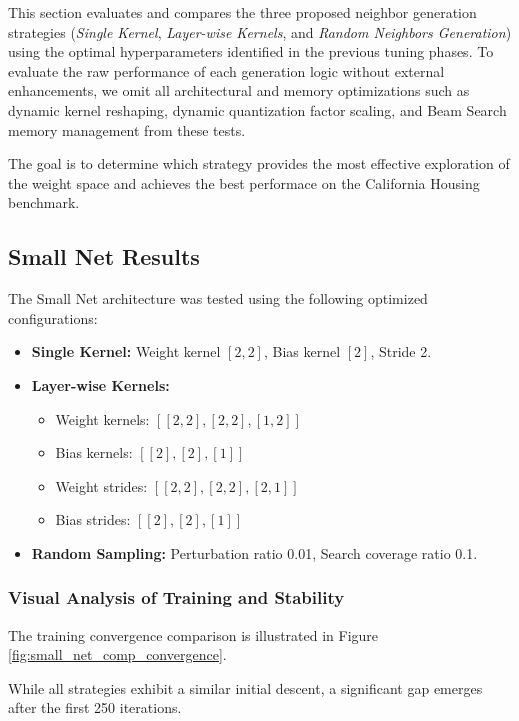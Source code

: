 This section evaluates and compares the three proposed neighbor generation strategies (\textit{Single Kernel}, \textit{Layer-wise Kernels}, and \textit{Random Neighbors Generation}) using the optimal hyperparameters identified in the previous tuning phases. To evaluate the raw performance of each generation logic without external enhancements, we omit all architectural and memory optimizations such as dynamic kernel reshaping, dynamic quantization factor scaling, and Beam Search memory management from these tests.

The goal is to determine which strategy provides the most effective exploration of the weight space and achieves the best performace on the California Housing benchmark.

\subsection{Small Net Results}

The Small Net architecture was tested using the following optimized configurations:
\begin{itemize}
    \item \textbf{Single Kernel:} Weight kernel $[2,2]$, Bias kernel $[2]$, Stride 2.
    \item \textbf{Layer-wise Kernels:} 
        \begin{itemize}
            \item Weight kernels: $[[2,2], [2,2], [1,2]]$
            \item Bias kernels: $[[2], [2], [1]]$
            \item Weight strides: $[[2,2], [2,2], [2,1]]$
            \item Bias strides: $[[2], [2], [1]]$
        \end{itemize}
    \item \textbf{Random Sampling:} Perturbation ratio 0.01, Search coverage ratio 0.1.
\end{itemize}

\subsubsection{Visual Analysis of Training and Stability}

The training convergence comparison is illustrated in Figure \ref{fig:small_net_comp_convergence}. 

While all strategies exhibit a similar initial descent, a significant gap emerges after the first 250 iterations.

